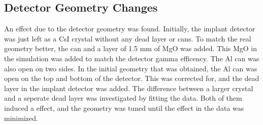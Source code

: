 \documentclass[../main.tex]{subfiles}
\begin{document}
\subsection{Detector Geometry Changes}
An effect due to the detector geometry was found.
Initially, the implant detector was just left as a CsI crystal without any dead layer or cans.
To match the real geometry better, the can and a layer of 1.5 mm of MgO was added.
This MgO in the simulation was added to match the detector gamma efficency. 
The Al can was also open on two sides.
In the initial geometry that was obtained, the Al can was open on the top and bottom of the detector.
This was corrected for, and the dead layer in the implant detector was added.
The difference between a larger crystal and a seperate dead layer was investigated by fitting the data.
Both of them induced a effect, and the geometry was tuned until the effect in the data was minimized.
\end{document}
